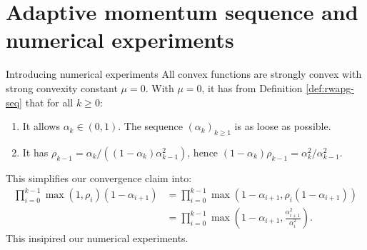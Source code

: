 \documentclass[11pt]{beamer}
\theoremstyle{definition}
\begin{document}
\section{Adaptive momentum sequence and numerical experiments}
    \begin{frame}{Introducing numerical experiments}
        All convex functions are strongly convex with strong convexity constant $\mu = 0$. 
        With $\mu = 0$, it has from Definition \ref{def:rwapg-seq} that for all $k \ge 0$: 
        \begin{enumerate}
            \item It allows $\alpha_k \in (0, 1)$. The sequence $(\alpha_k)_{k \ge 1}$ is as loose as possible. 
            \item It has $\rho_{k - 1} = \alpha_k/((1 - \alpha_k)\alpha_{k - 1}^2)$, hence $(1 - \alpha_k)\rho_{k - 1} = \alpha_k^2/\alpha_{k - 1}^2$. 
        \end{enumerate}
        This simplifies our convergence claim into: 
        \begin{align*}
            \prod_{i = 0}^{k - 1}
            \max(1, \rho_i)(1 - \alpha_{i + 1})
            &= 
            \prod_{i = 0}^{k - 1}
            \max(1 - \alpha_{i + 1}, \rho_i(1 - \alpha_{i + 1}))
            \\
            &= 
            \prod_{i = 0}^{k - 1}
            \max\left(
            1 - \alpha_{i + 1}, \frac{\alpha_{i + 1}^2}{\alpha_i^2}\right). 
        \end{align*}
        This insipired our numerical experiments. 
    \end{frame}
\end{document}
